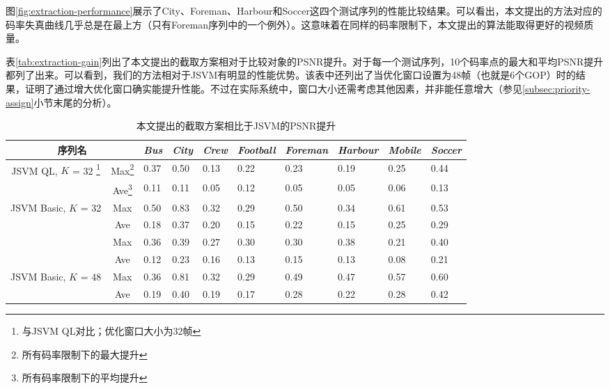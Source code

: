图\ref{fig:extraction-performance}展示了City、Foreman、Harbour和Soccer这四个测试序列的性能比较结果。可以看出，本文提出的方法对应的码率失真曲线几乎总是在最上方（只有Foreman序列中的一个例外）。这意味着在同样的码率限制下，本文提出的算法能取得更好的视频质量。

表\ref{tab:extraction-gain}列出了本文提出的截取方案相对于比较对象的PSNR提升。对于每一个测试序列，10个码率点的最大和平均PSNR提升都列了出来。可以看到，我们的方法相对于JSVM有明显的性能优势。该表中还列出了当优化窗口设置为48帧（也就是6个GOP）时的结果，证明了通过增大优化窗口确实能提升性能。不过在实际系统中，窗口大小还需考虑其他因素，并非能任意增大（参见\ref{subsec:priority-assign}小节末尾的分析）。

\begin{table}[h]
	\centering
	\caption{本文提出的截取方案相比于JSVM的PSNR提升}
	\label{tab:extraction-gain}
	\small
	\begin{minipage}{1.0\linewidth}
		\centering
		\begin{tabular}{c|c|*{3}{p{0.9cm}<{\centering}|}*{4}{p{1.1cm}<{\centering}|}p{0.9cm}<{\centering}}
			\hline \hline
			\multicolumn{2}{c|}{序列名} &
			{\em Bus} & {\em City} & {\em Crew} & {\em Football} & {\em Foreman} & {\em Harbour} & {\em Mobile} & {\em Soccer} \\ \hline 
			\multirow{2}{*}{JSVM QL, $K$ = 32 \footnote{\label{footnote:JSVM_QL} 与JSVM QL对比；优化窗口大小为32帧}}
			& Max\footnote{\label{footnote:max} 所有码率限制下的最大提升}
			& 0.37 & 0.50 & 0.13 & 0.22 & 0.23 & 0.19 & 0.25 & 0.44 \\ \cline{2-10}
			& Ave\footnote{\label{footnote:ave} 所有码率限制下的平均提升}
			& 0.11 & 0.11 & 0.05 & 0.12 & 0.05 & 0.05 & 0.06 & 0.13 \\ \hline
			\multirow{2}{*}{JSVM Basic, $K$ = 32}
			& Max & 0.50 & 0.83 & 0.32 & 0.29 & 0.50 & 0.34 & 0.61 & 0.53 \\ \cline{2-10}
			& Ave & 0.18 & 0.37 & 0.20 & 0.15 & 0.22 & 0.15 & 0.25 & 0.29 \\ \Xhline{2\arrayrulewidth}
			\multirow{2}{*}{JSVM QL, $K$ = 48}
			& Max & 0.36 & 0.39 & 0.27 & 0.30 & 0.30 & 0.38 & 0.21 & 0.40 \\ \cline{2-10}
			& Ave & 0.12 & 0.23 & 0.16 & 0.13 & 0.15 & 0.13 & 0.08 & 0.21 \\ \hline
			\multirow{2}{*}{JSVM Basic, $K$ = 48}
			& Max & 0.36 & 0.81 & 0.32 & 0.29 & 0.49 & 0.47 & 0.57 & 0.60 \\ \cline{2-10}
			& Ave & 0.19 & 0.40 & 0.19 & 0.17 & 0.28 & 0.22 & 0.28 & 0.42 \\ \hline
		\end{tabular}
	\end{minipage}
\end{table}

